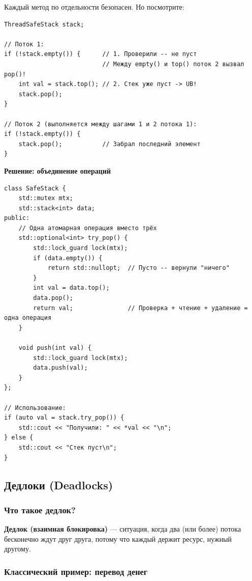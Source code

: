 \documentclass[a4paper,12pt]{article}
\begin{document}
Каждый метод по отдельности безопасен. Но посмотрите:

\begin{lstlisting}
ThreadSafeStack stack;

// Поток 1:
if (!stack.empty()) {      // 1. Проверили -- не пуст
                           // Между empty() и top() поток 2 вызвал pop()!
    int val = stack.top(); // 2. Стек уже пуст -> UB!
    stack.pop();
}

// Поток 2 (выполняется между шагами 1 и 2 потока 1):
if (!stack.empty()) {
    stack.pop();           // Забрал последний элемент
}
\end{lstlisting}

\textbf{Решение: объединение операций}

\begin{lstlisting}
class SafeStack {
    std::mutex mtx;
    std::stack<int> data;
public:
    // Одна атомарная операция вместо трёх
    std::optional<int> try_pop() {
        std::lock_guard lock(mtx);
        if (data.empty()) {
            return std::nullopt;  // Пусто -- вернули "ничего"
        }
        int val = data.top();
        data.pop();
        return val;               // Проверка + чтение + удаление = одна операция
    }

    void push(int val) {
        std::lock_guard lock(mtx);
        data.push(val);
    }
};

// Использование:
if (auto val = stack.try_pop()) {
    std::cout << "Получили: " << *val << "\n";
} else {
    std::cout << "Стек пуст\n";
}
\end{lstlisting}

\subsection{Дедлоки (Deadlocks)}

\subsubsection{Что такое дедлок?}

\textbf{Дедлок (взаимная блокировка)} --- ситуация, когда два (или более) потока
бесконечно ждут друг друга, потому что каждый держит ресурс, нужный другому.

\subsubsection{Классический пример: перевод денег}
\end{document}
